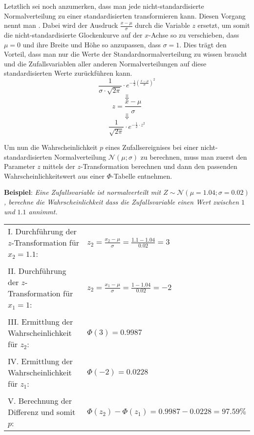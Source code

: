 \pagebreak


Letztlich sei noch anzumerken, dass man jede nicht-standardisierte Normalverteilung zu einer standardisierten transformieren kann. Diesen Vorgang nennt man . Dabei wird der Ausdruck $\frac{x - \mu}{\sigma}$ durch die Variable $z$ ersetzt, um somit die nicht-standardisierte Glockenkurve auf der $x$-Achse so zu verschieben, dass $\mu = 0$ und ihre Breite und H\"{o}he so anzupassen, dass $\sigma = 1$. Dies tr\"{a}gt den Vorteil, dass man nur die Werte der Standardnormalverteilung zu wissen braucht und die Zufallsvariablen aller anderen Normalverteilungen auf diese standardisierten Werte zur\"{u}ckf\"{u}hren kann. $$\frac{1}{\sigma \cdot \sqrt{2\pi}} \cdot e^{-\frac{1}{2}\left(\frac{x - \mu}{\sigma}\right)^2}$$ $$\Downarrow$$ $$z = \frac{x - \mu}{\sigma} $$ $$\Downarrow$$ $$\frac{1}{\sqrt{2\pi}} \cdot e^{-\frac{1}{2} \cdot z^2}$$

\pagebreak


Um nun die Wahrscheinlichkeit $p$ eines Zufallsereignises bei einer nicht-standardisierten Normalverteilung $\mathcal{N}(\mu; \sigma)$ zu berechnen, muss man zuerst den Parameter $z$ mittels der $z$-Transformation berechnen und dann den passenden Wahrscheinlichkeitswert aus einer $\Phi$-Tabelle entnehmen.

\textbf{Beispiel}: \emph{Eine Zufallsvariable ist normalverteilt mit $Z \sim \mathcal{N}(\mu=1.04; \sigma=0.02)$, berechne die Wahrscheinlichkeit dass die Zufallsvariable einen Wert zwischen $1$ und $1.1$ annimmt.}

\begin{table}[h!]
	\begin{tabular}{l l}
	I. Durchf\"{u}hrung der $z$-Transformation f\"{u}r $x_{2} = 1.1$: & $z_{2} = \frac{x_{2} - \mu}{\sigma} = \frac{1.1 - 1.04}{0.02} = 3$
	\\ & \\
	II. Durchf\"{u}hrung der $z$-Transformation f\"{u}r $x_{1} = 1$: & $z_{2} = \frac{x_{1} - \mu}{\sigma} = \frac{1 - 1.04}{0.02} = -2$
	\\ & \\
	III. Ermittlung der Wahrscheinlichkeit f\"{u}r $z_{2}$: & $\Phi(3) = 0.9987$
	\\ & \\
	IV. Ermittlung der Wahrscheinlichkeit f\"{u}r $z_{1}$: & $\Phi(-2) = 0.0228$
	\\ & \\
	V. Berechnung der Differenz und somit $p$: & $\Phi(z_{2}) - \Phi(z_{1}) = 0.9987 - 0.0228 = 97.59\%$
	\end{tabular}
\end{table}

